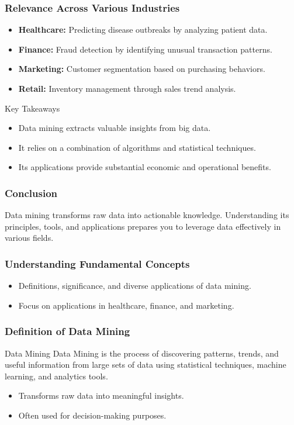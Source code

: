 \documentclass{beamer}
\begin{document}
\begin{frame}[fragile]
    \frametitle{Relevance Across Various Industries}
    \begin{itemize}
        \item \textbf{Healthcare:} Predicting disease outbreaks by analyzing patient data.
        \item \textbf{Finance:} Fraud detection by identifying unusual transaction patterns.
        \item \textbf{Marketing:} Customer segmentation based on purchasing behaviors.
        \item \textbf{Retail:} Inventory management through sales trend analysis.
    \end{itemize}

    \begin{block}{Key Takeaways}
        \begin{itemize}
            \item Data mining extracts valuable insights from big data.
            \item It relies on a combination of algorithms and statistical techniques.
            \item Its applications provide substantial economic and operational benefits.
        \end{itemize}
    \end{block}
\end{frame}

\begin{frame}[fragile]
    \frametitle{Conclusion}
    Data mining transforms raw data into actionable knowledge. Understanding its principles, tools, and applications prepares you to leverage data effectively in various fields.
\end{frame}

\begin{frame}[fragile]
    \frametitle{Understanding Fundamental Concepts}
    \begin{itemize}
        \item Definitions, significance, and diverse applications of data mining.
        \item Focus on applications in healthcare, finance, and marketing.
    \end{itemize}
\end{frame}

\begin{frame}[fragile]
    \frametitle{Definition of Data Mining}
    \begin{block}{Data Mining}
        Data Mining is the process of discovering patterns, trends, and useful information from large sets of data using statistical techniques, machine learning, and analytics tools.
    \end{block}
    \begin{itemize}
        \item Transforms raw data into meaningful insights.
        \item Often used for decision-making purposes.
    \end{itemize}
\end{frame}
\end{document}
